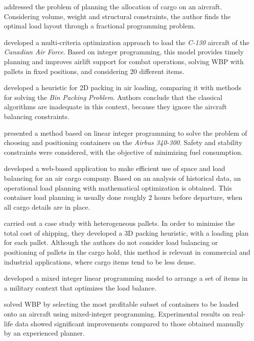\documentclass[preprint,authoryear]{elsarticle}
\begin{document}
\cite{Brosh1981} addressed the problem of planning the allocation of cargo on an aircraft. Considering volume, weight and structural constraints, the author finds the optimal load layout through a fractional programming problem.

\cite{Kevin1992} developed a multi-criteria optimization approach to load the {\it C-130} aircraft of the {\it Canadian Air Force}. Based on integer programming, this model provides timely planning and improves airlift support for combat operations, solving WBP with pallets in fixed positions, and considering 20 different items.

\cite{Heidelberg1998} developed a heuristic for 2D packing in air loading, comparing it with methods for solving the {\it Bin Packing Problem}. Authors conclude that the classical algorithms are inadequate in this context, because they ignore the aircraft balancing constraints.

\cite{MongeauBes2003} presented a method based on linear integer programming to solve the problem of choosing and positioning containers on the {\it Airbus 340-300}. Safety and stability constraints were considered, with the objective of minimizing fuel consumption.

\cite{fok2004optimizing} developed a web-based application to make efficient use of space and load balancing for an air cargo company. Based on an analysis of historical data, an operational load planning with mathematical optimization is obtained. This container load planning is usually done roughly 2 hours before departure, when all cargo details are in place.

\cite{Chan2006} carried out a case study with heterogeneous pallets. In order to minimise the total cost of shipping, they developed a 3D packing heuristic, with a loading plan for each pallet. Although the authors do not consider load balancing or positioning of pallets in the cargo hold, this method is relevant in commercial and industrial applications, where cargo items tend to be less dense.

\cite{KaluznyBohdanL2009Oalb} developed a mixed integer linear programming model to arrange a set of items in a military context that optimizes the load balance.

\cite{Verstichel2011} solved WBP by selecting the most profitable subset of containers to be loaded onto an aircraft using mixed-integer programming. Experimental results on real-life data showed significant improvements compared to those obtained manually by an experienced planner.
\end{document}
